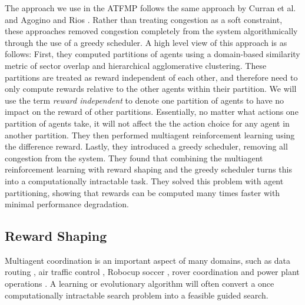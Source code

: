 \documentclass{aamas2014}
\begin{document}
The approach we use in the ATFMP follows the same approach by Curran et al. \cite{Curran:2013:AHC:2484920.2485183} and Agogino and Rios \cite{Agogino:2009:EEM:1570256.1570258, Rios}. Rather than treating congestion as a soft constraint, these approaches removed congestion completely from the system algorithmically through the use of a greedy scheduler. A high level view of this approach is as follows: First, they computed partitions of agents using a domain-based similarity metric of sector overlap and hierarchical agglomerative clustering. These partitions are treated as reward independent of each other, and therefore need to only compute rewards relative to the other agents within their partition. We will use the term \textit{reward independent} to denote one partition of agents to have no impact on the reward of other partitions. Essentially, no matter what actions one partition of agents take, it will not affect the the action choice for any agent in another partition. They then performed multiagent reinforcement learning using the difference reward. Lastly, they introduced a greedy scheduler, removing all congestion from the system. They found that combining the multiagent reinforcement learning with reward shaping and the greedy scheduler turns this into a computationally intractable task. They solved this problem with agent partitioning, showing that rewards can be computed many times faster with minimal performance degradation.





\subsection{Reward Shaping}
Multiagent coordination is an important aspect of many domains, such as data routing \cite{tumer-wolpert_jair02}, air traffic control \cite{tumer-agogino_jaamas12}, Robocup soccer \cite{AAMAS12-agmon}, rover coordination \cite{5509316} and power plant operations \cite{Colby:2012:SFF:2343576.2343637}. A learning or evolutionary algorithm will often convert a once computationally intractable search problem into a feasible guided search. 
\end{document}
